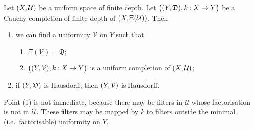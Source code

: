 \begin{proposition}
Let $\sSet{X, \mathcal{U}}$ be a uniform space of finite depth. Let $\sSet[\big]{\sSet{Y, \mathfrak{D}}, k: X\to Y}$ be a Cauchy completion of finite depth of $\sSet{X, \Xi(\mathcal{U})}$. Then
\begin{enumerate}
\item we can find a uniformity $\mathcal{V}$ on $Y$ such that
\begin{enumerate}
\item $\Xi(\mathcal{V}) = \mathfrak{D}$;
\item $\sSet[\big]{\sSet{Y, \mathcal{V}}, k: X\to Y}$ is a uniform completion of $\sSet{X, \mathcal{U}}$;
\end{enumerate} 
\item if $\sSet{Y, \mathfrak{D}}$ is Hausdorff, then $\sSet{Y, \mathcal{V}}$ is Hausdorff.
\end{enumerate}
\end{proposition}
Point (1) is not immediate, because there may be filters in $\mathcal{U}$ whose factorisation is not in $\mathcal{U}$. These filters may be mapped by $k$ to filters outside the minimal (i.e.\ factorisable) uniformity on $Y$.
